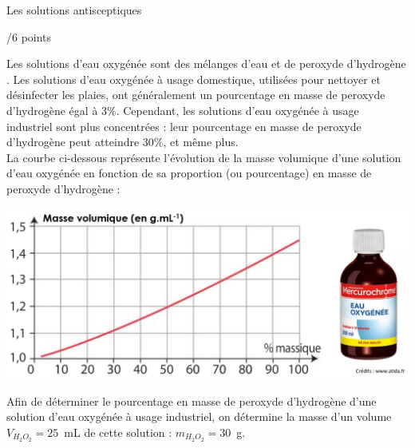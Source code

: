 \begin{doc}{Les solutions antisceptiques \begin{Large}
    /6 points
\end{Large}}
Les solutions d’eau oxygénée sont des mélanges d’eau et de peroxyde d’hydrogène . Les solutions d’eau oxygénée à usage domestique, utilisées pour nettoyer et désinfecter les plaies, ont généralement un pourcentage en masse de peroxyde d’hydrogène égal à 3\%. Cependant, les solutions d’eau oxygénée à usage industriel sont plus concentrées : leur pourcentage en masse de peroxyde d’hydrogène peut atteindre 30\%, et même plus.\\

La courbe ci-dessous représente l’évolution de la masse volumique d’une solution d’eau oxygénée en fonction de sa proportion (ou pourcentage) en masse de peroxyde d’hydrogène :

\begin{center}
    \includegraphics[scale=0.4]{Images/Peroxyde_hydrogene.png}
\end{center}

Afin de déterminer le pourcentage en masse de peroxyde d’hydrogène d’une solution d’eau oxygénée à usage industriel, on détermine la masse d’un volume $V_{H_2O_2} = 25$~mL de cette solution : $m_{H_2O_2} = 30$~g.\\
\end{doc}
